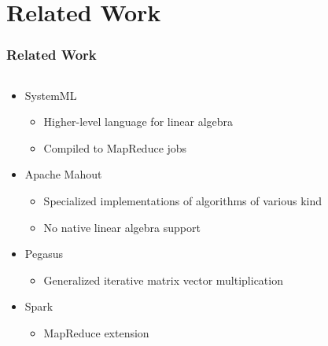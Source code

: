 \section{Related Work}

\begin{frame}
\frametitle{Related Work}
	\begin{columns}
		\begin{column}{0.7\textwidth}
			\begin{itemize}
				\item SystemML~\cite{ghoting:2011a}
				\begin{itemize}
					\item Higher-level language for linear algebra
					\item Compiled to MapReduce jobs 
				\end{itemize}
				\item Apache Mahout~\cite{apache:a2011}
				\begin{itemize}
					\item Specialized implementations of algorithms of various kind
					\item No native linear algebra support
				\end{itemize}
				\item Pegasus~\cite{kang:2009a}
				\begin{itemize}
					\item Generalized iterative matrix vector multiplication
				\end{itemize}
				\item Spark~\cite{zaharia:2010a}
				\begin{itemize}
					\item MapReduce extension
				\end{itemize}
			\end{itemize}
		\end{column}
		\begin{column}{0.3\textwidth}

\end{column}
\end{columns}
\end{frame}
